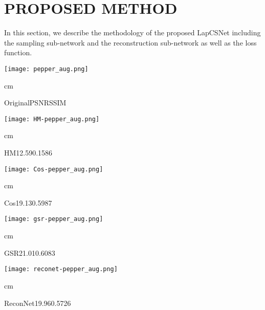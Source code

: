 \documentclass{article}
\begin{document}
\section{PROPOSED METHOD}
\label{sec:format}

In this section, we describe the methodology of the proposed LapCSNet including the sampling sub-network and the reconstruction sub-network as well as the loss function.


\begin{figure*}[tb]
\begin{minipage}[t]{0.12\textwidth}
\centering
\texttt{[image: pepper\_aug.png]}
\begin{scriptsize}
\centering
{} cm \begin{tiny}OriginalPSNRSSIM\end{tiny}
\end{scriptsize}
\end{minipage}
\hfill
\begin{minipage}[t]{0.12\textwidth}
\centering
\texttt{[image: HM-pepper\_aug.png]}
\begin{scriptsize}
\centering
{} cm \begin{tiny}HM12.590.1586\end{tiny}
\end{scriptsize}
\end{minipage}
\hfill
\begin{minipage}[t]{0.12\textwidth}
\centering
\texttt{[image: Cos-pepper\_aug.png]}
\begin{scriptsize}
\centering
{} cm \begin{tiny}Cos19.130.5987\end{tiny}
\end{scriptsize}
\end{minipage}
\hfill
\begin{minipage}[t]{0.12\textwidth}
\centering
\texttt{[image: gsr-pepper\_aug.png]}
\begin{scriptsize}
\centering
{} cm \begin{tiny}GSR21.010.6083\end{tiny}
\end{scriptsize}
\end{minipage}
\hfill
\begin{minipage}[t]{0.12\textwidth}
\centering
\texttt{[image: reconet-pepper\_aug.png]}
\begin{scriptsize}
\centering
{} cm \begin{tiny}ReconNet19.960.5726\end{tiny}

\end{scriptsize}
\end{minipage}
\end{figure*}
\end{document}
